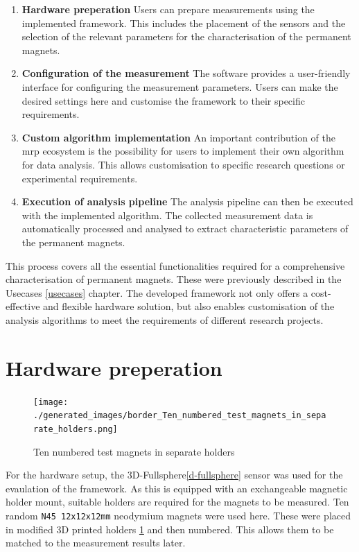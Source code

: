 \begin{enumerate}
\def\labelenumi{\arabic{enumi}.}
\item
  \textbf{Hardware preperation} Users can prepare measurements using the
  implemented framework. This includes the placement of the sensors and
  the selection of the relevant parameters for the characterisation of
  the permanent magnets.
\item
  \textbf{Configuration of the measurement} The software provides a
  user-friendly interface for configuring the measurement parameters.
  Users can make the desired settings here and customise the framework
  to their specific requirements.
\item
  \textbf{Custom algorithm implementation} An important contribution of
  the \gls{mrp} ecosystem is the possibility for users to implement
  their own algorithm for data analysis. This allows customisation to
  specific research questions or experimental requirements.
\item
  \textbf{Execution of analysis pipeline} The analysis pipeline can then
  be executed with the implemented algorithm. The collected measurement
  data is automatically processed and analysed to extract characteristic
  parameters of the permanent magnets.
\end{enumerate}

This process covers all the essential functionalities required for a
comprehensive characterisation of permanent magnets. These were
previously described in the Usecases \ref{usecases} chapter. The
developed framework not only offers a cost-effective and flexible
hardware solution, but also enables customisation of the analysis
algorithms to meet the requirements of different research projects.

\hypertarget{hardware-preperation}{%
\section{Hardware preperation}\label{hardware-preperation}}

\begin{figure}
\centering
\texttt{[image: ./generated\_images/border\_Ten\_numbered\_test\_magnets\_in\_separate\_holders.png]}
\caption{Ten numbered test magnets in separate holders
\label{Ten_numbered_test_magnets_in_separate_holders.png}}
\end{figure}

For the hardware setup, the 3D-Fullsphere\ref{d-fullsphere} sensor was
used for the evaulation of the framework. As this is equipped with an
exchangeable magnetic holder mount, suitable holders are required for
the magnets to be measured. Ten random
\passthrough{\lstinline!N45 12x12x12mm!} neodymium magnets were used
here. These were placed in modified 3D printed holders
\ref{Ten_numbered_test_magnets_in_separate_holders.png} and then
numbered. This allows them to be matched to the measurement results
later.

